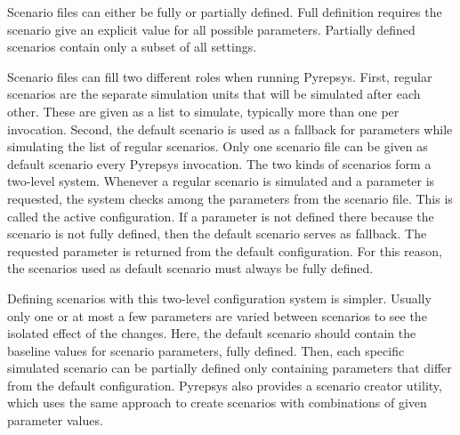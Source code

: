 \documentclass[%
    ]{\PathToTumTemplate/thesis/tum_thesis}
\begin{document}
Scenario files can either be fully or partially defined.
Full definition requires the scenario give an explicit value for all possible parameters.
Partially defined scenarios contain only a subset of all settings.

Scenario files can fill two different roles when running Pyrepsys.
First, regular scenarios are the separate simulation units that will be simulated after each other.
These are given as a list to simulate, typically more than one per invocation.
Second, the default scenario is used as a fallback for parameters while simulating the list of regular scenarios.
Only one scenario file can be given as default scenario every Pyrepsys invocation.
The two kinds of scenarios form a two-level system.
Whenever a regular scenario is simulated and a parameter is requested, the system checks among the parameters from the scenario file.
This is called the active configuration.
If a parameter is not defined there because the scenario is not fully defined, then the default scenario serves as fallback.
The requested parameter is returned from the default configuration.
For this reason, the scenarios used as default scenario must always be fully defined.

Defining scenarios with this two-level configuration system is simpler.
Usually only one or at most a few parameters are varied between scenarios to see the isolated effect of the changes.
Here, the default scenario should contain the baseline values for scenario parameters, fully defined.
Then, each specific simulated scenario can be partially defined only containing parameters that differ from the default configuration.
Pyrepsys also provides a scenario creator utility, which uses the same approach to create scenarios with combinations of given parameter values.
\end{document}

